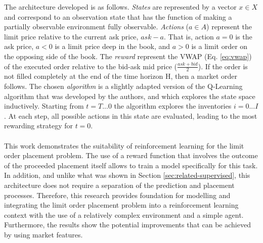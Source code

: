 The architecture developed is as follows.
\textit{States} are represented by a vector $x \in X$ and correspond to an observation state that has the function of making a  partially observable environment fully observable.
\textit{Actions} ($a \in A$) represent the limit price relative to the current ask price, $ask - a$. 
That is, action $a = 0$ is the ask price, $a < 0$ is a limit price deep in the book, and $a > 0$ is a limit order on the opposing side of the book.
The \textit{reward} represent the VWAP (Eq. \ref{eq:vwap}) of the executed order relative to the bid-ask mid price ($\frac{ask + bid}{2}$).
If the order is not filled completely at the end of the time horizon H, then a market order follows.
The chosen \textit{algorithm} is a slightly adapted version of the Q-Learning algorithm that was developed by the authors, and which explores the state space inductively.
Starting from $t=T...0$ the algorithm explores the inventories $i=0...I$.
At each step, all possible actions in this state are evaluated, leading to the most rewarding strategy for $t=0$.
\\
\\
This work demonstrates the suitability of reinforcement learning for the limit order placement problem.
The use of a reward function that involves the outcome of the proceeded placement itself allows to train a model specifically for this task.
In addition, and unlike what was shown in Section \ref{sec:related-supervised}, this architecture does not require a separation of the prediction and placement processes.
Therefore, this research provides foundation for modelling and integrating the limit order placement problem into a reinforcement learning context with the use of a relatively complex environment and a simple agent.
Furthermore, the results show the potential improvements that can be achieved by using market features.